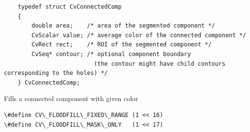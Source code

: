 \begin{lstlisting}
    typedef struct CvConnectedComp
    {
        double area;    /* area of the segmented component */
        CvScalar value; /* average color of the connected component */
        CvRect rect;    /* ROI of the segmented component */
        CvSeq* contour; /* optional component boundary
                          (the contour might have child contours corresponding to the holes) */
    } CvConnectedComp;

\end{lstlisting}

\label{FloodFill}

Fills a connected component with given color


\begin{lstlisting}
\#define CV\_FLOODFILL\_FIXED\_RANGE (1 << 16)
\#define CV\_FLOODFILL\_MASK\_ONLY   (1 << 17)
\end{lstlisting}

